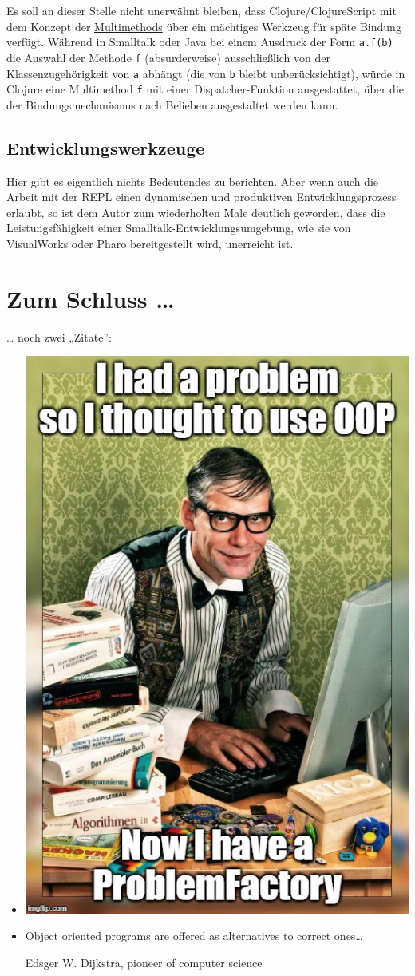 \documentclass[11pt]{article}
\begin{document}
Es soll an dieser Stelle nicht unerwähnt bleiben, dass
Clojure/ClojureScript mit dem Konzept der \href{https://clojure.org/reference/multimethods}{Multimethods} über ein
mächtiges Werkzeug für späte Bindung verfügt. Während in Smalltalk
oder Java bei einem Ausdruck der Form \texttt{a.f(b)} die Auswahl der Methode
\texttt{f} (absurderweise) ausschließlich von der Klassenzugehörigkeit von
\texttt{a} abhängt (die von \texttt{b} bleibt unberücksichtigt), würde in Clojure
eine Multimethod \texttt{f} mit einer Dispatcher-Funktion ausgestattet, über
die der Bindungsmechanismus nach Belieben ausgestaltet werden kann.

\subsection*{Entwicklungswerkzeuge}
\label{sec:orga40a768}

Hier gibt es eigentlich nichts Bedeutendes zu berichten. Aber wenn
auch die Arbeit mit der REPL einen dynamischen und produktiven
Entwicklungsprozess erlaubt, so ist dem
Autor zum wiederholten Male deutlich geworden, dass die
Leistungsfähigkeit einer Smalltalk-Entwicklungsumgebung, wie sie von
VisualWorks oder Pharo bereitgestellt wird, unerreicht ist.
\section*{Zum Schluss \ldots{}}
\label{sec:orgbcf11e0}
\ldots{} noch zwei „Zitate”: 
\begin{itemize}
\item \begin{center}
\includegraphics[width=.5\linewidth]{./problemfactory.jpeg}
\end{center}
\item Object oriented programs are offered as alternatives to correct ones…

Edsger W. Dijkstra, pioneer of computer science
\end{itemize}
\end{document}
